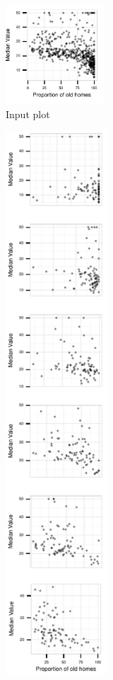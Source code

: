 \begin{figure}
 \centering 
    \begin{subfigure}[t]{1.45in}
        \includegraphics[width=1.45in]{images/AGE-MEDV.pdf}
        \caption{Input plot}
        \label{fig:method_original}
    \end{subfigure}
    \begin{subfigure}[t]{1.5in}
  	\includegraphics[width=1.5in]{images/DIS.pdf}

\end{subfigure}
\end{figure}
